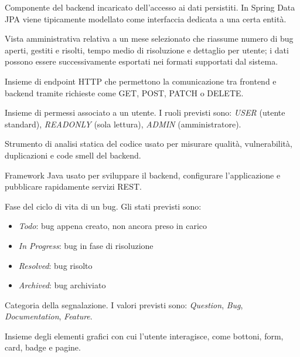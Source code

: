 ﻿\documentclass[a4paper,11pt]{article}
\begin{document}
\begin{description}[style=nextline,leftmargin=3.5cm,labelwidth=3.3cm]
\item[\textbf{Repository}] Componente del backend incaricato dell'accesso ai dati persistiti. In Spring Data JPA viene tipicamente modellato come interfaccia dedicata a una certa entit\`a.

\item[\textbf{Report Mensile}] Vista amministrativa relativa a un mese selezionato che riassume numero di bug aperti, gestiti e risolti, tempo medio di risoluzione e dettaglio per utente; i dati possono essere successivamente esportati nei formati supportati dal sistema.

\item[\textbf{REST API}] Insieme di endpoint HTTP che permettono la comunicazione tra frontend e backend tramite richieste come GET, POST, PATCH o DELETE.

\item[\textbf{Ruolo}] Insieme di permessi associato a un utente. I ruoli previsti sono: \emph{USER} (utente standard), \emph{READONLY} (sola lettura), \emph{ADMIN} (amministratore).

\item[\textbf{SonarQube}] Strumento di analisi statica del codice usato per misurare qualit\`a, vulnerabilit\`a, duplicazioni e code smell del backend.

\item[\textbf{Spring Boot}] Framework Java usato per sviluppare il backend, configurare l'applicazione e pubblicare rapidamente servizi REST.

\item[\textbf{Stato (Status)}] Fase del ciclo di vita di un bug. Gli stati previsti sono:
  \begin{itemize}
    \item \emph{Todo}: bug appena creato, non ancora preso in carico
    \item \emph{In Progress}: bug in fase di risoluzione
    \item \emph{Resolved}: bug risolto
    \item \emph{Archived}: bug archiviato
  \end{itemize}

\item[\textbf{Tipo (Type)}] Categoria della segnalazione. I valori previsti sono: \emph{Question}, \emph{Bug}, \emph{Documentation}, \emph{Feature}.

\item[\textbf{UI (User Interface)}] Insieme degli elementi grafici con cui l'utente interagisce, come bottoni, form, card, badge e pagine.


\end{description}
\end{document}
